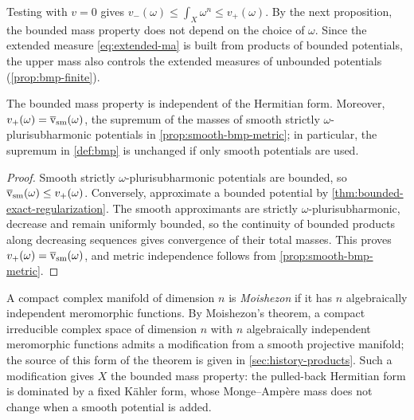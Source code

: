 Testing with $v=0$ gives $v_-(\omega)\leq\int_X\omega^n\leq v_+(\omega)$. By the next proposition, the bounded mass property does not depend on the choice of $\omega$. Since the extended measure \eqref{eq:extended-ma} is built from products of bounded potentials, the upper mass also controls the extended measures of unbounded potentials (\cref{prop:bmp-finite}).

\begin{proposition}\label{prop:bmp-metric}
The bounded mass property is independent of the Hermitian form. Moreover, $v_+(\omega)=\overline{\mathrm v}_{\mathrm{sm}}(\omega)$, the supremum of the masses of smooth strictly $\omega$-plurisubharmonic potentials in \cref{prop:smooth-bmp-metric}; in particular, the supremum in \cref{def:bmp} is unchanged if only smooth potentials are used.
\end{proposition}
\begin{proof}
Smooth strictly $\omega$-plurisubharmonic potentials are bounded, so $\overline{\mathrm v}_{\mathrm{sm}}(\omega)\leq v_+(\omega)$. Conversely, approximate a bounded potential by \cref{thm:bounded-exact-regularization}. The smooth approximants are strictly $\omega$-plurisubharmonic, decrease and remain uniformly bounded, so the continuity of bounded products along decreasing sequences gives convergence of their total masses. This proves $v_+(\omega)=\overline{\mathrm v}_{\mathrm{sm}}(\omega)$, and metric independence follows from \cref{prop:smooth-bmp-metric}.
\end{proof}

A compact complex manifold of dimension $n$ is \emph{Moishezon} if it has $n$ algebraically independent meromorphic functions. By Moishezon's theorem, a compact irreducible complex space of dimension $n$ with $n$ algebraically independent meromorphic functions admits a modification from a smooth projective manifold; the source of this form of the theorem is given in \cref{sec:history-products}. Such a modification gives $X$ the bounded mass property: the pulled-back Hermitian form is dominated by a fixed K\"ahler form, whose Monge--Amp\`ere mass does not change when a smooth potential is added.

